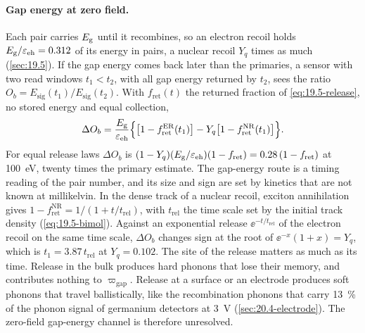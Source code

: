 \paragraph{Gap energy at zero field.} Each pair carries $E_{\mathrm{g}}$ until it recombines, so an electron recoil holds $E_{\mathrm{g}}/\varepsilon_{\mathrm{eh}} = 0.312$ of its energy in pairs, a nuclear recoil $Y_q$ times as much (\cref{sec:19.5}). If the gap energy comes back later than the primaries, a sensor with two read windows $t_1 < t_2$, with all gap energy returned by $t_2$, sees the ratio $O_b = E_{\mathrm{sig}}(t_1)/E_{\mathrm{sig}}(t_2)$. With $f_{\mathrm{ret}}(t)$ the returned fraction of \cref{eq:19.5-release}, no stored energy and equal collection,
\begin{equation}
  \Delta O_b = \frac{E_{\mathrm{g}}}{\varepsilon_{\mathrm{eh}}}\Bigl\{\bigl[1 - f^{\mathrm{ER}}_{\mathrm{ret}}(t_1)\bigr] - Y_q\bigl[1 - f^{\mathrm{NR}}_{\mathrm{ret}}(t_1)\bigr]\Bigr\} .
  \label{eq:20.5-gap}
\end{equation}
For equal release laws $\Delta O_b$ is $(1 - Y_q)(E_{\mathrm{g}}/\varepsilon_{\mathrm{eh}})(1 - f_{\mathrm{ret}}) = 0.28\,(1 - f_{\mathrm{ret}})$ at \SI{100}{eV}, twenty times the primary estimate. The gap-energy route is a timing reading of the pair number, and its size and sign are set by kinetics that are not known at millikelvin. In the dense track of a nuclear recoil, exciton annihilation gives $1 - f^{\mathrm{NR}}_{\mathrm{ret}} = 1/(1 + t/t_{\mathrm{rel}})$, with $t_{\mathrm{rel}}$ the time scale set by the initial track density (\cref{eq:19.5-bimol}). Against an exponential release $\ee^{-t/t_{\mathrm{rel}}}$ of the electron recoil on the same time scale, $\Delta O_b$ changes sign at the root of $\ee^{-x}(1 + x) = Y_q$, which is $t_1 = 3.87\,t_{\mathrm{rel}}$ at $Y_q = 0.102$. The site of the release matters as much as its time. Release in the bulk produces hard phonons that lose their memory, and contributes nothing to $\varpi_{\mathrm{gap}}$. Release at a surface or an electrode produces soft phonons that travel ballistically, like the recombination phonons that carry \SI{13}{\percent} of the phonon signal of germanium detectors at \SI{3}{V} (\cref{sec:20.4-electrode}). The zero-field gap-energy channel is therefore unresolved.

